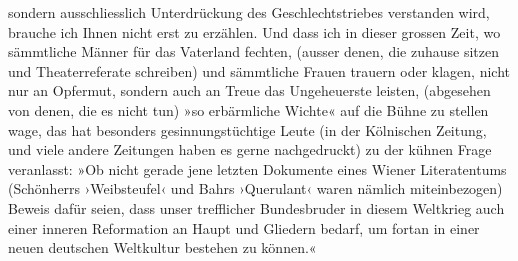                sondern ausschliesslich Unterdrückung des Geschlechtstrieb\introOben{}e\introOben{}s
               verstanden wird, brauche ich Ihnen nicht erst zu erzählen. Und dass ich in dieser
               grossen Zeit, wo sämmtliche Männer für das Vaterland fechten, (ausser denen, die
               zuhause sitzen und Theaterreferate schreiben) und sämmtliche Frauen trauern oder
               klagen, nicht nur an Opfermut, sondern auch an Treue das Ungeheuerste leisten,
               (abgesehen von denen, die es nicht tun) »so erbärmliche Wichte« auf die Bühne zu
               stellen wage, das hat besonders gesinnungstüchtige Leute (in der Kölnischen Zeitung, und viele andere Zeitungen haben es gerne
               nachgedruckt) zu der kühnen Frage veranlasst: »Ob nicht gerade jene letzten Dokumente eines Wiener Literatentums (Schön{\pb}herrs ›Weibsteufel‹ und Bahrs
                     ›Querulant‹ waren nämlich miteinbezogen)
                  Beweis dafür seien, dass unser trefflicher Bundesbruder in diesem Weltkrieg auch
                  einer inneren Reformation an Haupt und Gliedern bedarf, um fortan in einer neuen
                  deutschen Weltkultur bestehen zu können.«\pend
           

